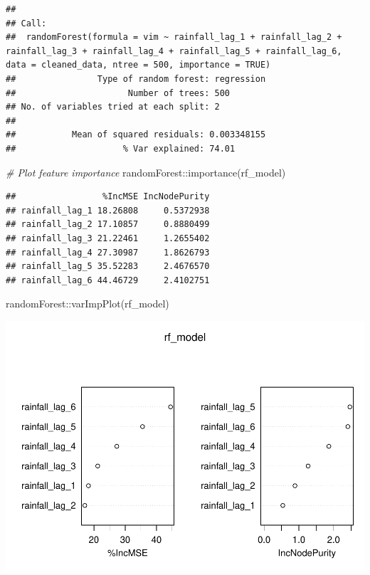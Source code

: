 \documentclass[
]{article}
\newenvironment{Shaded}{}{}
\newcommand{\CommentTok}[1]{\textcolor[rgb]{0.38,0.63,0.69}{\textit{#1}}}
\newcommand{\FunctionTok}[1]{\textcolor[rgb]{0.02,0.16,0.49}{#1}}
\newcommand{\NormalTok}[1]{#1}
\newcommand{\SpecialCharTok}[1]{\textcolor[rgb]{0.25,0.44,0.63}{#1}}
\begin{document}
\begin{verbatim}
## 
## Call:
##  randomForest(formula = vim ~ rainfall_lag_1 + rainfall_lag_2 +      rainfall_lag_3 + rainfall_lag_4 + rainfall_lag_5 + rainfall_lag_6,      data = cleaned_data, ntree = 500, importance = TRUE) 
##                Type of random forest: regression
##                      Number of trees: 500
## No. of variables tried at each split: 2
## 
##           Mean of squared residuals: 0.003348155
##                     % Var explained: 74.01
\end{verbatim}

\begin{Shaded}
\begin{Highlighting}[]
\CommentTok{\# Plot feature importance}
\NormalTok{randomForest}\SpecialCharTok{::}\FunctionTok{importance}\NormalTok{(rf\_model)}
\end{Highlighting}
\end{Shaded}

\begin{verbatim}
##                 %IncMSE IncNodePurity
## rainfall_lag_1 18.26808     0.5372938
## rainfall_lag_2 17.10857     0.8880499
## rainfall_lag_3 21.22461     1.2655402
## rainfall_lag_4 27.30987     1.8626793
## rainfall_lag_5 35.52283     2.4676570
## rainfall_lag_6 44.46729     2.4102751
\end{verbatim}

\begin{Shaded}
\begin{Highlighting}[]
\NormalTok{randomForest}\SpecialCharTok{::}\FunctionTok{varImpPlot}\NormalTok{(rf\_model)}
\end{Highlighting}
\end{Shaded}

\begin{center}\includegraphics{BI_VegetationResponse_Project_HarvardX_Ph125_9x_files/figure-latex/ml_rain_ndvi_randomforest-1} \end{center}
\end{document}
